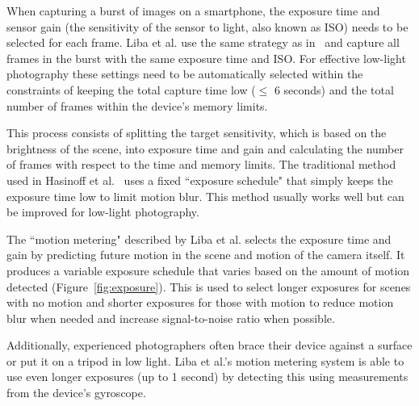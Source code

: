 \documentclass{sig-alternate}
\begin{document}
When capturing a burst of images on a smartphone, the exposure time and sensor gain (the sensitivity of the sensor to light, also known as ISO) needs to be selected for each frame. Liba et al. use the same strategy as in~\cite{Hasinoff2016} and capture all frames in the burst with the same exposure time and ISO. For effective low-light photography these settings need to be automatically selected within the constraints of keeping the total capture time low ($\leq$ 6 seconds) and the total number of frames within the device's memory limits.

This process consists of splitting the target sensitivity, which is based on the brightness of the scene, into exposure time and gain and calculating the number of frames with respect to the time and memory limits. The traditional method used in Hasinoff et al.~\cite{Hasinoff2016} uses a fixed ``exposure schedule" that simply keeps the exposure time low to limit motion blur. This method usually works well but can be improved for low-light photography.

The ``motion metering" described by Liba et al. selects the exposure time and gain by predicting future motion in the scene and motion of the camera itself. It produces a variable exposure schedule that varies based on the amount of motion detected (Figure~\ref{fig:exposure}). This is used to select longer exposures for scenes with no motion and shorter exposures for those with motion to reduce motion blur when needed and increase signal-to-noise ratio when possible.

Additionally, experienced photographers often brace their device against a surface or put it on a tripod in low light. Liba et al.'s motion metering system is able to use even longer exposures (up to 1 second) by detecting this using measurements from the device's gyroscope.





\end{document}
